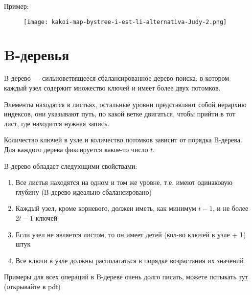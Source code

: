 Пример:
\begin{figure}[H]
    \centering
    \texttt{[image: kakoi-map-bystree-i-est-li-alternativa-Judy-2.png]}
\end{figure}


\section{B-деревья}

\begin{definition}
    B-дерево --- сильноветвящееся сбалансированное дерево поиска, в котором каждый узел содержит множество ключей и имеет более двух потомков.

    Элементы находятся в листьях, остальные уровни представляют собой иерархию индексов, они указывают путь, по какой ветке двигаться, чтобы прийти в тот лист, где находится нужная запись.

    Количество ключей в узле и количество потомков зависит от порядка B-дерева. Для каждого дерева фиксируется какое-то число $t$.

    B-дерево обладает следующими свойствами:
    \begin{enumerate}
        \item Все листья находятся на одном и том же уровне, т.е. имеют одинаковую глубину (B-дерево идеально сбалансировано)
        \item Каждый узел, кроме корневого, должен иметь, как минимум $t-1$, и не более $2t-1$ ключей
        \item Если узел не является листом, то он имеет детей (кол-во ключей в узле + 1) штук
        \item Все ключи в узле должны располагаться в порядке возрастания их значений
    \end{enumerate}
\end{definition}

\begin{remark}
    Примеры для всех операций в B-дереве очень долго писать, можете потыкать \href{https://www.cs.usfca.edu/~galles/visualization/BTree.html}{тут} (открывайте в pdf)
\end{remark}

